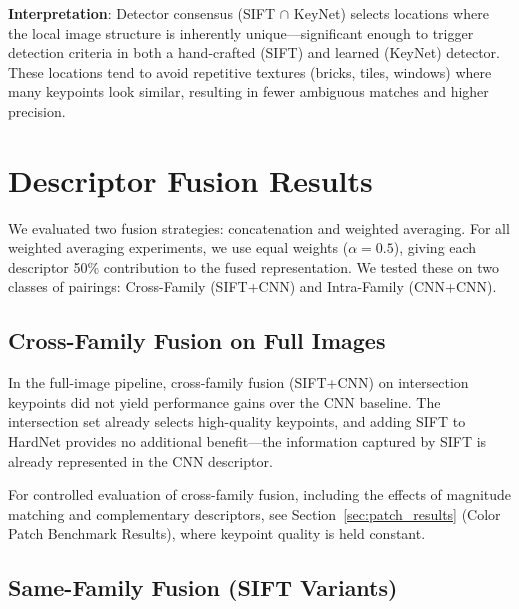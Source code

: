 \textbf{Interpretation}: Detector consensus (SIFT $\cap$ KeyNet) selects locations where the local image structure is inherently unique---significant enough to trigger detection criteria in both a hand-crafted (SIFT) and learned (KeyNet) detector. These locations tend to avoid repetitive textures (bricks, tiles, windows) where many keypoints look similar, resulting in fewer ambiguous matches and higher precision.

\section{Descriptor Fusion Results}%
\label{sec:fusion_results}

We evaluated two fusion strategies: concatenation and weighted averaging. For all weighted averaging experiments, we use equal weights ($\alpha = 0.5$), giving each descriptor 50\% contribution to the fused representation. We tested these on two classes of pairings: Cross-Family (SIFT+CNN) and Intra-Family (CNN+CNN).

\subsection{Cross-Family Fusion on Full Images}

In the full-image pipeline, cross-family fusion (SIFT+CNN) on intersection keypoints did not yield performance gains over the CNN baseline. The intersection set already selects high-quality keypoints, and adding SIFT to HardNet provides no additional benefit---the information captured by SIFT is already represented in the CNN descriptor.

For controlled evaluation of cross-family fusion, including the effects of magnitude matching and complementary descriptors, see Section~\ref{sec:patch_results} (Color Patch Benchmark Results), where keypoint quality is held constant.

\subsection{Same-Family Fusion (SIFT Variants)}

